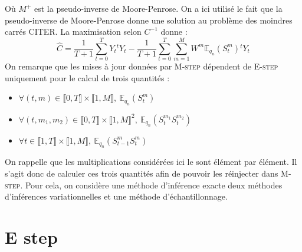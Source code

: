 \documentclass[10pt,a4paper]{article}
\newcommand{\Estep}{\textsc{E-step}}
\newcommand{\Mstep}{\textsc{M-step}}
\begin{document}
Où $M^+$ est la pseudo-inverse de Moore-Penrose. On a ici utilisé le fait que 
la pseudo-inverse de Moore-Penrose donne une solution au problème des moindres 
carrés CITER. La maximisation selon $C^{-1}$ donne :
\begin{equation}
\widehat{C}=\frac{1}{T+1}\underset{t=0}{\overset{T}{\sum}}Y_t 
{}^tY_t-\frac{1}{T+1}\underset{t=0}{\overset{T}{\sum}}\underset{m=1}{\overset{M}
{\sum}}W^m\mathbb{E}_{q_n}(S_t^m){}^t Y_t
\end{equation}
On remarque que les mises à jour données par \Mstep{} dépendent de \Estep{} 
uniquement pour le calcul de trois quantités :
\begin{itemize}
\item $\forall (t,m) \in \llbracket 0, T\rrbracket \times \llbracket 1,M 
\rrbracket, \ \mathbb{E}_{q_n}(S_t^m) $
\item $\forall (t,m_1,m_2) \in \llbracket 0, T\rrbracket \times \llbracket 
1,M\rrbracket^2, \ \mathbb{E}_{q_n}(S_t^{m_1}S_t^{m_2}) $
\item $\forall t \in \llbracket 1,T \rrbracket \times \llbracket 1,M 
\rrbracket, \ \mathbb{E}_{q_n}(S_{t-1}^mS_t^{m})$
\end{itemize}
On rappelle que les multiplications considérées ici le sont élément par 
élément. Il s'agit donc de calculer ces trois quantités afin de pouvoir les 
réinjecter dans \Mstep. Pour cela, on considère une méthode d'inférence exacte 
deux méthodes d'inférences variationnelles et une méthode d'échantillonnage.
\section{E step}
\end{document}
